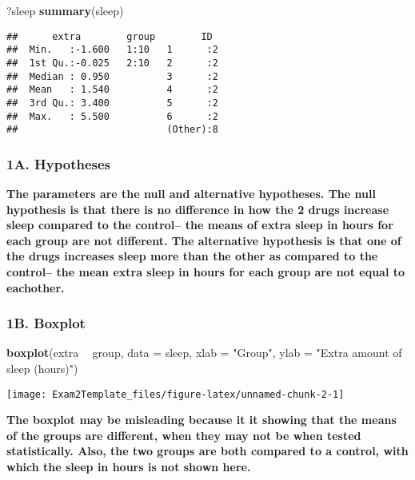\documentclass[]{article}
\newenvironment{Shaded}{\begin{snugshade}}{\end{snugshade}}
\newcommand{\DataTypeTok}[1]{\textcolor[rgb]{0.13,0.29,0.53}{#1}}
\newcommand{\KeywordTok}[1]{\textcolor[rgb]{0.13,0.29,0.53}{\textbf{#1}}}
\newcommand{\NormalTok}[1]{#1}
\newcommand{\OperatorTok}[1]{\textcolor[rgb]{0.81,0.36,0.00}{\textbf{#1}}}
\newcommand{\StringTok}[1]{\textcolor[rgb]{0.31,0.60,0.02}{#1}}
\begin{document}
\begin{Shaded}
\begin{Highlighting}[]
\NormalTok{?sleep}
\KeywordTok{summary}\NormalTok{(sleep)}
\end{Highlighting}
\end{Shaded}

\begin{verbatim}
##      extra        group        ID   
##  Min.   :-1.600   1:10   1      :2  
##  1st Qu.:-0.025   2:10   2      :2  
##  Median : 0.950          3      :2  
##  Mean   : 1.540          4      :2  
##  3rd Qu.: 3.400          5      :2  
##  Max.   : 5.500          6      :2  
##                          (Other):8
\end{verbatim}

\hypertarget{a.-hypotheses}{%
\subsubsection{1A. Hypotheses}\label{a.-hypotheses}}

\textbf{The parameters are the null and alternative hypotheses. The null
hypothesis is that there is no difference in how the 2 drugs increase
sleep compared to the control-- the means of extra sleep in hours for
each group are not different. The alternative hypothesis is that one of
the drugs increases sleep more than the other as compared to the
control-- the mean extra sleep in hours for each group are not equal to
eachother.}

\hypertarget{b.-boxplot}{%
\subsubsection{1B. Boxplot}\label{b.-boxplot}}

\begin{Shaded}
\begin{Highlighting}[]
\KeywordTok{boxplot}\NormalTok{(extra }\OperatorTok{~}\StringTok{ }\NormalTok{group, }\DataTypeTok{data =}\NormalTok{ sleep, }\DataTypeTok{xlab =} \StringTok{"Group"}\NormalTok{, }\DataTypeTok{ylab =} \StringTok{"Extra amount of sleep (hours)"}\NormalTok{)}
\end{Highlighting}
\end{Shaded}

\texttt{[image: Exam2Template\_files/figure-latex/unnamed-chunk-2-1]}

\textbf{The boxplot may be misleading because it it showing that the
means of the groups are different, when they may not be when tested
statistically. Also, the two groups are both compared to a control, with
which the sleep in hours is not shown here.}
\end{document}
